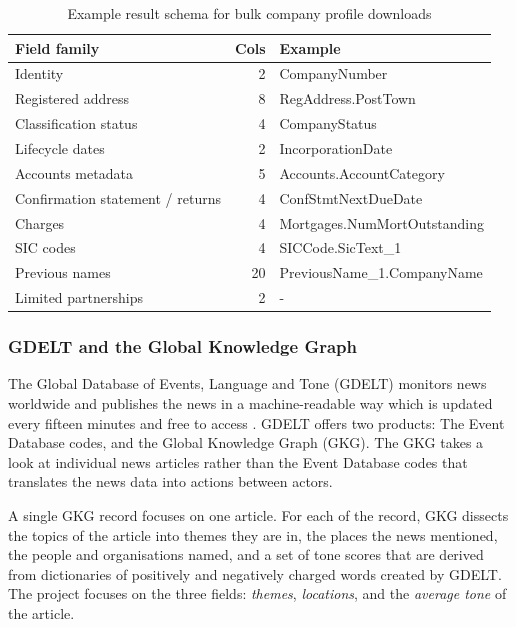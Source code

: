 \documentclass[ %
                    author={Natchalin Iwsakul \\ Inkaphol Siriwongwattana \\ Tanaphan Kummaraphat \\ Patorn Srisupap},
                supervisor={Fernando Moreno-Pino},
                    degree={MSc},
                     title={Propensity Modelling for SME Commercial Lending Using Open Public Data},
                  subtitle={Companies House filings and GDELT media coverage as predictors of first-time borrowing},
                      type={},
                      year={2026}]{dissertation}
\begin{document}
\begin{table}[h]
    \centering

    \begin{tabular}{lrl}
        \toprule
        Field family & Cols	& Example \\
        \midrule
        Identity & 2 & CompanyNumber \\
        Registered address & 8 & RegAddress.PostTown \\
        Classification status & 4 & CompanyStatus \\
        Lifecycle dates & 2 & IncorporationDate \\
        Accounts metadata & 5 & Accounts.AccountCategory \\
        Confirmation statement / returns & 4 & ConfStmtNextDueDate \\
        Charges & 4 & Mortgages.NumMortOutstanding \\
        SIC codes & 4 & SICCode.SicText\_1 \\
        Previous names & 20 & PreviousName\_1.CompanyName \\
        Limited partnerships & 2 & - \\
        \bottomrule
    \end{tabular}
    \caption{Example result schema for bulk company profile downloads}
    \label{tab:bulk_profile_example_schema}
\end{table}
\subsubsection{GDELT and the Global Knowledge Graph}
\label{sec:gdelt}

The Global Database of Events, Language and Tone (GDELT) monitors news worldwide and publishes the news in a machine-readable way which is updated every fifteen minutes and free to access \cite{leetaru2013gdelt}. GDELT offers two products: The Event Database codes, and the Global Knowledge Graph (GKG). The GKG takes a look at individual news articles rather than the Event Database codes that translates the news data into actions between actors.

A single GKG record focuses on one article. For each of the record, GKG dissects the topics of the article into themes they are in, the places the news mentioned, the people and organisations named, and a set of tone scores that are derived from dictionaries of positively and negatively charged words created by GDELT. The project focuses on the three fields: \textit{themes}, \textit{locations}, and the \textit{average tone} of the article.
\end{document}
